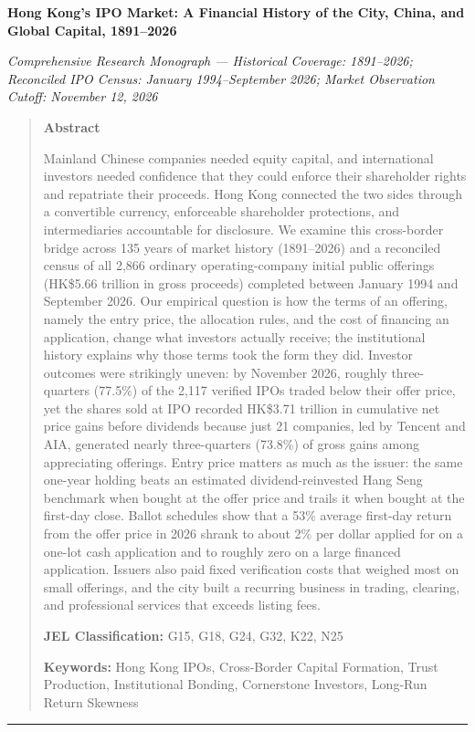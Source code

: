 \documentclass[11pt,letterpaper]{article}
\begin{document}
\thispagestyle{plain}

\begin{center}
{\LARGE\bfseries Hong Kong’s IPO Market: A Financial History of the City, China, and Global Capital, 1891–2026 \par}
\vspace{10pt}
{\normalsize \textit{Comprehensive Research Monograph — Historical Coverage: 1891–2026; Reconciled IPO Census: January 1994–September 2026; Market Observation Cutoff: November 12, 2026} \par}
\vspace{10pt}
\end{center}

\begin{quote}
\small
\begin{center}\textbf{Abstract}\end{center}
\vspace{-4pt}
\noindent Mainland Chinese companies needed equity capital, and international investors needed confidence that they could enforce their shareholder rights and repatriate their proceeds. Hong Kong connected the two sides through a convertible currency, enforceable shareholder protections, and intermediaries accountable for disclosure. We examine this cross-border bridge across 135 years of market history (1891–2026) and a reconciled census of all 2,866 ordinary operating-company initial public offerings (HK\$5.66 trillion in gross proceeds) completed between January 1994 and September 2026. Our empirical question is how the terms of an offering, namely the entry price, the allocation rules, and the cost of financing an application, change what investors actually receive; the institutional history explains why those terms took the form they did. Investor outcomes were strikingly uneven: by November 2026, roughly three-quarters (77.5\%) of the 2,117 verified IPOs traded below their offer price, yet the shares sold at IPO recorded HK\$3.71 trillion in cumulative net price gains before dividends because just 21 companies, led by Tencent and AIA, generated nearly three-quarters (73.8\%) of gross gains among appreciating offerings. Entry price matters as much as the issuer: the same one-year holding beats an estimated dividend-reinvested Hang Seng benchmark when bought at the offer price and trails it when bought at the first-day close. Ballot schedules show that a 53\% average first-day return from the offer price in 2026 shrank to about 2\% per dollar applied for on a one-lot cash application and to roughly zero on a large financed application. Issuers also paid fixed verification costs that weighed most on small offerings, and the city built a recurring business in trading, clearing, and professional services that exceeds listing fees.
\par\smallskip\noindent \textbf{JEL Classification:} G15, G18, G24, G32, K22, N25
\par\smallskip\noindent \textbf{Keywords:} Hong Kong IPOs, Cross-Border Capital Formation, Trust Production, Institutional Bonding, Cornerstone Investors, Long-Run Return Skewness
\end{quote}
\vspace{8pt}
\noindent\rule{\linewidth}{0.4pt}
\vspace{6pt}
\end{document}
